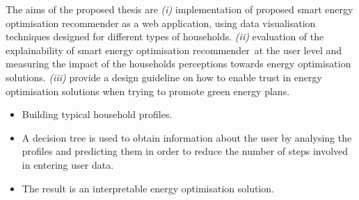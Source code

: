 The aims of the proposed thesis are 
\textit{(i)} implementation of proposed smart energy optimisation recommender as a web application, using data visualisation techniques designed for different types of households. 
\textit{(ii)} evaluation of the explainability of smart energy optimisation recommender at the user level and measuring the impact of the households perceptions towards energy optimisation solutions. 
\textit{(iii)} provide a design guideline on how to enable trust in energy optimisation solutions when trying to promote green energy plans. 

\begin{itemize}
  \item Building typical household profiles.
  \item A decision tree is used to obtain information about the user by analys\-ing the profiles and predicting them in order to reduce the number of steps involved in entering user data.
  \item The result is an interpretable energy optimisation solution.
\end{itemize}

